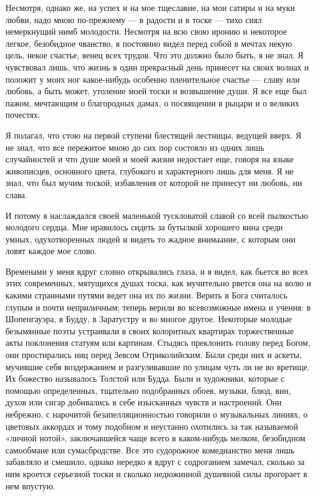 Несмотря, однако же, на  успех и на мое тщеславие, на  мои сатиры и на
муки любви,  надо мною по-прежнему  --- в радости  и в тоске  --- тихо
сиял  немеркнущий  нимб  молодости.  Несмотря на  всю  свою  иронию  и
некоторое легкое, безобидное чванство, я постоянно видел перед собой в
мечтах некую  цель, некое счастье,  венец всех трудов. Что  это должно
было быть, я  не знал. Я чувствовал лишь, что  жизнь в один прекрасный
день  принесет на  своих  волнах  и положит  у  моих ног  какое-нибудь
особенно  пленительное счастье  --- славу  или любовь,  а быть  может,
утоление моей тоски и возвышение души.  Я все еще был пажом, мечтающим
о благородных дамах, о посвящении в рыцари и о великих почестях.

Я  полагал, что  стою на  первой ступени  блестящей лестницы,  ведущей
вверх. Я не знал, что все пережитое  мною до сих пор состояло из одних
лишь случайностей и  что душе моей и моей жизни  недостает еще, говоря
на языке  живописцев, основного  цвета, глубокого и  характерного лишь
для меня.  Я не знал, что  был мучим тоской, избавления  от которой не
принесут ни любовь, ни слава.

И  потому я  наслаждался своей  маленькой тускловатой  славой со  всей
пылкостью молодого  сердца. Мне нравилось сидеть  за бутылкой хорошего
вина среди умных, одухотворенных людей и видеть то жадное внимаание, с
которым они ловят каждое мое слово.

Временами у меня вдруг словно открывались глаза, и я видел, как бьется
во всех этих современных, мятущихся душах тоска, как мучительно рвется
она на  волю и какими странными  путями ведет она их  по жизни. Верить
в  Бога  считалось  глупым  и  почти  неприличным;  теперь  верили  во
всевозможные имена  и учения: в  Шопенгауэра, в Будду, в  Заратустру и
во  многое другое.  Некоторые  молодые безымянные  поэты устраивали  в
своих колоритных  квартирах торжественные акты поклонения  статуям или
картинам. Стыдясь преклонить голову  перед Богом, они простирались ниц
перед Зевсом  Отриколийским. Были  среди них  и аскеты,  мучившие себя
воздержанием  и разгуливавшие  по улицам  чуть  ли не  во вретище.  Их
божество называлось  Толстой или  Будда. Были  и художники,  которые с
помощью определенных, тщательно подобранных  обоев, музыки, блюд, вин,
духов или сигар добивались в  себе изысканных чувств и настроений. Они
небрежно,  с  нарочитой  безапелляционностью  говорили  о  музыкальных
линиях, о цветовых  аккордах и тому подобном и  неустанно охотились за
так называемой «личной нотой», заключавшейся чаще всего в каком-нибудь
мелком, безобидном  самообмане или  сумасбродстве. Все  это судорожное
комедианство меня лишь  забавляло и смешило, однако нередко  я вдруг с
содроганием замечал, сколько за ним  кроется серьезной тоски и сколько
недюжинной душевной силы прогорает в нем впустую.

